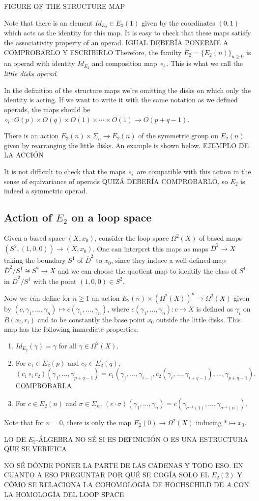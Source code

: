\documentclass[TFM.tex]{subfiles}
\begin{document}
 FIGURE OF THE STRUCTURE MAP


Note that there is an element $Id_{E_2}\in E_2(1)$ given by the coordinates $(0,1)$ which acts as the identity for this map. It is easy to check that these maps satisfy the associativity property of an operad. IGUAL DEBERÍA PONERME A COMPROBARLO Y ESCRIBIRLO Therefore, the familty $E_2=\{E_2(n)\}_{n\geq 0}$ is an operad with identity $Id_{E_2}$ and composition map $\circ_i$. This is what we call the \emph{little disks operad}.

\begin{remark}
In the definition of the structure maps we're omitting the disks on which only the identity is acting. If we want to write it with the same notation as we defined operads, the maps should be $\circ_i:O(p)\times O(q)\times O(1)\times\cdots \times O(1)\to O(p+q-1)$. 
\end{remark}

There is an action $E_2(n)\times \Sigma_n\to E_2(n)$ of the symmetric group on $E_2(n)$ given by rearranging the little disks. An example is shown below.
EJEMPLO DE LA ACCIÓN

It is not difficult to check that the maps $\circ_i$ are compatible with this action in the sense of equivariance of operads QUIZÁ DEBERÍA COMPROBARLO, so $E_2$ is indeed a symmetric operad. 

\subsection{Action of $E_2$ on a loop space}
Given a based space $(X,x_0)$, consider the loop space $\Omega^2(X)$ of based maps $(S^2, (1,0,0))\to (X, x_0)$. One can interpret this maps as maps $\overline{D}^2\to X$ taking the boundary $S^1$ of $\overline{D}^2$ to $x_0$, since they induce a well defined map $\overline{D}^2/S^1\cong S^2\to X$ and we can choose the quotient map to identify the class of $S^1$ in $\overline{D}^2/S^1$ with the point $(1,0,0)\in S^2$. 

Now we can define for $n\geq 1$ an action $E_2(n)\times (\Omega^2(X))^n\to \Omega^2(X)$ given by $(c,\gamma_1,\dots, \gamma_n)\mapsto c(\gamma_1,\dots, \gamma_n)$, where 
$c(\gamma_1,\dots, \gamma_n):c\to X$ is defined as $\gamma_i$ on $B(x_i,r_i)$ and to be constantly the base point $x_0$ outside the little disks. This map has the following immediate properties:
\begin{enumerate}
\item $Id_{E_2}(\gamma)=\gamma$ for all $\gamma\in \Omega^2(X)$.
\item For $c_1\in E_2(p)$ and $c_2\in E_2(q)$, 
$$(c_1\circ_i c_2)(\gamma_1,\dots, \gamma_{p+q-1})=c_1(\gamma_1,\dots, \gamma_{i-1}, c_2(\gamma_i,\dots, \gamma_{i+q-1}),\dots, \gamma_{p+q-1}).$$ COMPROBARLA
\item For $c\in E_2(n)$ and $\sigma\in\Sigma_n$, $(c\cdot \sigma)(\gamma_1,\dots,\gamma_n)=c(\gamma_{\sigma^{-1}(1)},\dots, \gamma_{\sigma^{-1}(n)})$. 
\end{enumerate}
Note that for $n=0$, there is only the map $E_2(0)\to\Omega^2(X)$ inducing $*\mapsto x_0$. 

LO DE $E_2$-ÁLGEBRA NO SÉ SI ES DEFINICIÓN O ES UNA ESTRUCTURA QUE SE VERIFICA

NO SÉ DÓNDE PONER LA PARTE DE LAS CADENAS Y TODO ESO. EN CUANTO A ESO PREGUNTAR POR QUÉ SE COGÍA SOLO EL $E_2(2)$ Y CÓMO SE RELACIONA LA COHOMOLOGÍA DE HOCHSCHILD DE $A$ CON LA HOMOLOGÍA DEL LOOP SPACE
\end{document}
